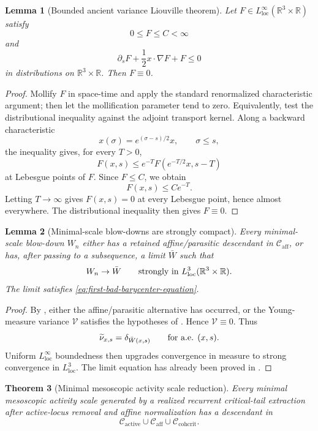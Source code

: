 \documentclass[11pt]{amsart}
\numberwithin{equation}{section}
\theoremstyle{plain}
\newtheorem{theorem}{Theorem}[section]
\newtheorem{lemma}[theorem]{Lemma}
\theoremstyle{definition}
\theoremstyle{remark}
\newcommand{\loc}{\mathrm{loc}}
\newcommand{\Cactive}{\mathcal C_{\mathrm{active}}}
\newcommand{\Caff}{\mathcal C_{\mathrm{aff}}}
\newcommand{\Ccohcrit}{\mathcal C_{\mathrm{cohcrit}}}
\begin{document}
\begin{lemma}[Bounded ancient variance Liouville theorem]
\label{lem:bounded-variance-liouville}
Let \(F\in L^\infty_{\loc}(\mathbb R^3\times\mathbb R)\) satisfy
\[
   0\le F\le C<\infty
\]
and
\[
   \partial_sF+\frac12x\cdot\nabla F+F\le0
\]
in distributions on \(\mathbb R^3\times\mathbb R\).  Then \(F\equiv0\).
\end{lemma}

\begin{proof}
Mollify \(F\) in space-time and apply the standard renormalized
characteristic argument; then let the mollification parameter tend to zero.
Equivalently, test the distributional inequality against the adjoint transport
kernel.  Along a backward characteristic
\[
   x(\sigma)=e^{(\sigma-s)/2}x,\qquad \sigma\le s,
\]
the inequality gives, for every \(T>0\),
\[
   F(x,s)\le e^{-T}F(e^{-T/2}x,s-T)
\]
at Lebesgue points of \(F\).  Since \(F\le C\), we obtain
\[
   F(x,s)\le Ce^{-T}.
\]
Letting \(T\to\infty\) gives \(F(x,s)=0\) at every Lebesgue point, hence
almost everywhere.  The distributional inequality then gives \(F\equiv0\).
\end{proof}

\begin{lemma}[Minimal-scale blow-downs are strongly compact]
\label{lem:first-bad-strong-compactness}
Every minimal-scale blow-down \(W_n\) either has a retained affine/parasitic
descendant in \(\Caff\), or has, after passing to a subsequence, a limit
\(\bar W\) such that
\[
   W_n\to\bar W
   \qquad\hbox{strongly in }L^3_{\loc}(\mathbb R^3\times\mathbb R).
\]
The limit satisfies \eqref{eq:first-bad-barycenter-equation}.
\end{lemma}

\begin{proof}
By , either the affine/parasitic alternative
has occurred, or the Young-measure variance \(\mathcal V\) satisfies the
hypotheses of
.  Hence \(\mathcal V\equiv0\).  Thus
\[
   \widetilde\nu_{x,s}=\delta_{\bar W(x,s)}
   \qquad\hbox{for a.e. }(x,s).
\]
Uniform \(L^\infty_{\loc}\) boundedness then upgrades convergence in measure to
strong convergence in \(L^3_{\loc}\).  The limit equation has already been
proved in .
\end{proof}

\begin{theorem}[Minimal mesoscopic activity scale reduction]
\label{thm:first-bad-mesoscopic-routing}
Every minimal mesoscopic activity scale generated by a realized recurrent
critical-tail extraction after active-locus removal and affine normalization
has a descendant in
\[
   \Cactive\cup\Caff\cup\Ccohcrit .
\]
\end{theorem}
\end{document}

